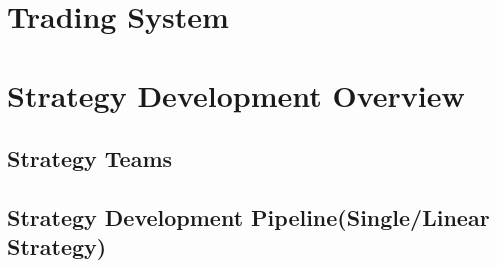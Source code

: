 \documentclass[11pt, openany]{book}              %
\begin{document}
\chapter{ Trading System }

\chapter{ Strategy Development Overview}

\section{Strategy Teams}







\section{ Strategy Development Pipeline(Single/Linear Strategy) }
\end{document}
